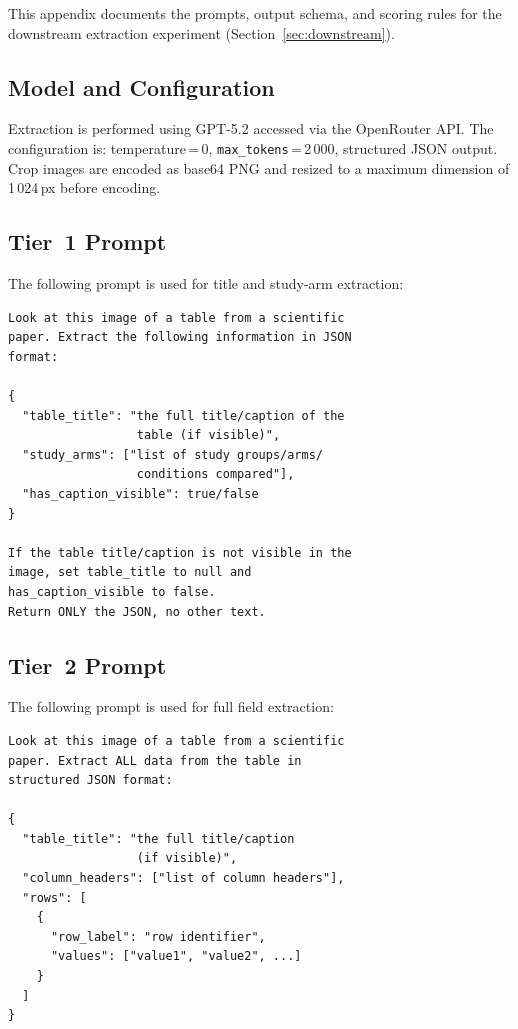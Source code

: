 \documentclass[pdflatex,sn-mathphys-num,iicol]{sn-jnl}
\begin{document}
\begin{appendices}
This appendix documents the prompts, output schema, and scoring rules for the
downstream extraction experiment (Section~\ref{sec:downstream}).

\subsection*{Model and Configuration}

Extraction is performed using GPT-5.2 accessed via the OpenRouter API. The configuration is: temperature\,=\,0, \texttt{max\_tokens}\,=\,2\,000,
structured JSON output. Crop images are encoded as base64 PNG and resized to a
maximum dimension of 1\,024\,px before encoding.

\subsection*{Tier~1 Prompt}

The following prompt is used for title and study-arm extraction:

\begin{small}
\begin{verbatim}
Look at this image of a table from a scientific
paper. Extract the following information in JSON
format:

{
  "table_title": "the full title/caption of the
                  table (if visible)",
  "study_arms": ["list of study groups/arms/
                  conditions compared"],
  "has_caption_visible": true/false
}

If the table title/caption is not visible in the
image, set table_title to null and
has_caption_visible to false.
Return ONLY the JSON, no other text.
\end{verbatim}
\end{small}

\subsection*{Tier~2 Prompt}

The following prompt is used for full field extraction:

\begin{small}
\begin{verbatim}
Look at this image of a table from a scientific
paper. Extract ALL data from the table in
structured JSON format:

{
  "table_title": "the full title/caption
                  (if visible)",
  "column_headers": ["list of column headers"],
  "rows": [
    {
      "row_label": "row identifier",
      "values": ["value1", "value2", ...]
    }
  ]
}


\end{verbatim}
\end{small}
\end{appendices}
\end{document}
